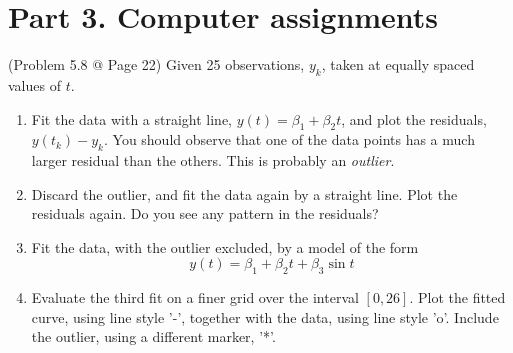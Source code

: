 \documentclass[10pt]{report}
\begin{document}
\section*{Part 3. Computer assignments}
(Problem 5.8 @ Page 22) Given 25 observations, $y_k$, taken at equally spaced values of $t$.
\begin{enumerate}
	\item 
	Fit the data with a straight line, $y(t) = \beta_1 + \beta_2t$, and plot the residuals, $y(t_k)−y_k$. You should observe that one of the data points has a much larger residual than the others. This is probably an \textit{outlier}.
	
	\item 
	Discard the outlier, and fit the data again by a straight line. Plot the residuals again. Do you see any pattern in the residuals?
	
	\item 
	Fit the data, with the outlier excluded, by a model of the form
	\[
	y(t) = \beta_1 + \beta_2 t + \beta_3 \sin t
	\]
	
	\item 
	Evaluate the third fit on a finer grid over the interval $[0,26]$. Plot the fitted curve, using line style '-', together with the data, using line style 'o'. Include the outlier, using a different marker, '*'.
\end{enumerate}
\end{document}
